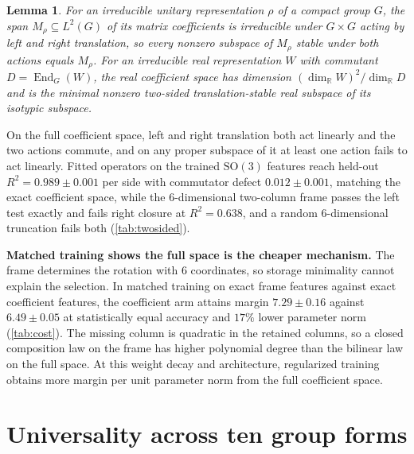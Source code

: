 \documentclass{article}
\newtheorem{lemma}{Lemma}
\DeclareMathOperator{\End}{End}
\newcommand{\SO}{\mathrm{SO}}
\newcommand{\R}{\mathbb{R}}
\begin{document}
\begin{lemma}
\label{lem:twosided}
For an irreducible unitary representation $\rho$ of a compact group
$G$, the span $M_\rho \subseteq L^2(G)$ of its matrix coefficients is
irreducible under $G \times G$ acting by left and right translation,
so every nonzero subspace of $M_\rho$ stable under both actions equals
$M_\rho$. For an irreducible real representation $W$ with commutant
$D = \End_G(W)$, the real coefficient space has dimension
$(\dim_\R W)^2/\dim_\R D$ and is the minimal nonzero two-sided
translation-stable real subspace of its isotypic subspace.
\end{lemma}

On the full coefficient space, left and right translation both act
linearly and the two actions commute, and on any proper subspace of it
at least one action fails to act linearly. Fitted operators on the trained $\SO(3)$ features
reach held-out $R^2 = 0.989 \pm 0.001$ per side with commutator defect
$0.012 \pm 0.001$, matching the exact coefficient space, while the
$6$-dimensional two-column frame passes the left test exactly and fails
right closure at $R^2 = 0.638$, and a random $6$-dimensional truncation
fails both (\cref{tab:twosided}).

\textbf{Matched training shows the full space is the cheaper mechanism.}
The frame determines the rotation with $6$ coordinates, so storage
minimality cannot explain the selection. In matched training on exact frame features against exact coefficient
features, the coefficient arm attains margin $7.29 \pm 0.16$ against
$6.49 \pm 0.05$ at statistically equal accuracy and $17\%$ lower
parameter norm (\cref{tab:cost}). The missing column is quadratic in the retained columns, so a closed
composition law on the frame has higher polynomial degree than the
bilinear law on the full space. At this weight decay and architecture, regularized training obtains more
margin per unit parameter norm from the full coefficient space.

\section{Universality across ten group forms}
\label{sec:universality}
\end{document}
